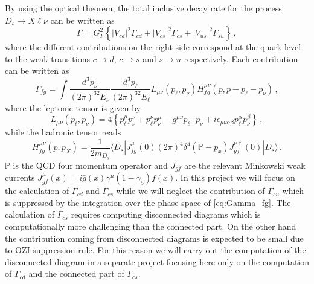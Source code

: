 By using the optical theorem, the total inclusive decay rate for the
process $D_s \to X\ell\nu$ can be written as
\begin{equation} 
  \Gamma = G^2_F\left\{ |V_{cd} |^2 \Gamma_{cd} + |V_{cs} |^2 \Gamma_{cs} + |V_{us} |^2 \Gamma_{su}
  \right\}\,,
\end{equation}
where the different contributions on the right side correspond at the quark level to the weak
transitions $c \to d$, $c \to s$ and $s \to u$ respectively. Each contribution can be written as
\begin{equation}\label{eq:Gamma_fg}
  \Gamma_{fg}=\int \frac{d^3p_\nu}{(2\pi)^32E_\nu}\frac{d^3p_\ell}{(2\pi)^32E_\ell}
  L_{\mu\nu}(p_\ell, p_\nu) H^{\mu\nu}_{fg}(p,p-p_\ell-p_\nu)\,,
\end{equation}
where the leptonic tensor is given by
\begin{equation}
  L_{\mu\nu}(p_\ell, p_\nu) =4\left\{p_\ell^\mu p_\nu^\nu +p_\ell^\nu
  p_\nu^\mu - g^{\mu\nu} p_\ell\cdot p_\nu+
  i\epsilon_{\mu\nu\alpha\beta} p_\ell^\alpha p_\nu^\beta\right\}\,, 
\end{equation}
while the hadronic tensor reads
\begin{equation}
  H^{\mu\nu}_{fg}(p,p_X)=\frac{1}{2m_{D_s}}\langle D_s| J^\mu_{fg}(0)(2\pi)^4
  \delta^4(\mathbb{P}-p_x) J^{\nu\dagger}_{gf} (0)| D_s\rangle\,.
\end{equation}
$\mathbb{P}$ is the QCD four momentum operator and $J_{gf}$ are the
relevant Minkowski weak currents $J_{gf}^\mu(x)=i\bar
g(x)\gamma^\mu(1-\gamma_5)f(x)$. 
In this project we will focus on the calculation of $\Gamma_{cd}$ and $\Gamma_{cs}$ while we will neglect the contribution of $\Gamma_{su}$ which is suppressed by the integration over the phase space of \eqref{eq:Gamma_fg}.
The calculation of $\Gamma_{cs}$ requires computing disconnected diagrams which is computationally more challenging than the connected part.
On the other hand the contribution coming from disconnected diagrams is expected to be small due to OZI-suppression rule.
For this reason we will carry out the computation of the disconnected diagram in a separate project focusing here only on the computation of $\Gamma_{cd}$ and the connected part of $\Gamma_{cs}$.


